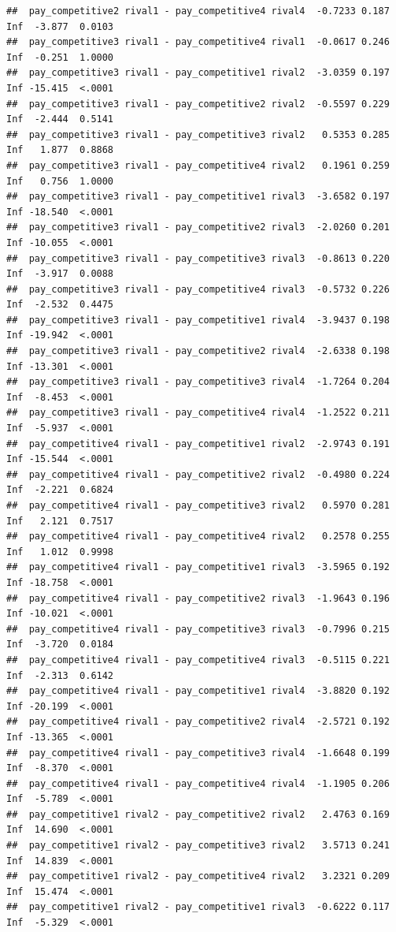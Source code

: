 \documentclass[
]{article}
\begin{document}
\begin{verbatim}
##  pay_competitive2 rival1 - pay_competitive4 rival4  -0.7233 0.187 Inf  -3.877  0.0103
##  pay_competitive3 rival1 - pay_competitive4 rival1  -0.0617 0.246 Inf  -0.251  1.0000
##  pay_competitive3 rival1 - pay_competitive1 rival2  -3.0359 0.197 Inf -15.415  <.0001
##  pay_competitive3 rival1 - pay_competitive2 rival2  -0.5597 0.229 Inf  -2.444  0.5141
##  pay_competitive3 rival1 - pay_competitive3 rival2   0.5353 0.285 Inf   1.877  0.8868
##  pay_competitive3 rival1 - pay_competitive4 rival2   0.1961 0.259 Inf   0.756  1.0000
##  pay_competitive3 rival1 - pay_competitive1 rival3  -3.6582 0.197 Inf -18.540  <.0001
##  pay_competitive3 rival1 - pay_competitive2 rival3  -2.0260 0.201 Inf -10.055  <.0001
##  pay_competitive3 rival1 - pay_competitive3 rival3  -0.8613 0.220 Inf  -3.917  0.0088
##  pay_competitive3 rival1 - pay_competitive4 rival3  -0.5732 0.226 Inf  -2.532  0.4475
##  pay_competitive3 rival1 - pay_competitive1 rival4  -3.9437 0.198 Inf -19.942  <.0001
##  pay_competitive3 rival1 - pay_competitive2 rival4  -2.6338 0.198 Inf -13.301  <.0001
##  pay_competitive3 rival1 - pay_competitive3 rival4  -1.7264 0.204 Inf  -8.453  <.0001
##  pay_competitive3 rival1 - pay_competitive4 rival4  -1.2522 0.211 Inf  -5.937  <.0001
##  pay_competitive4 rival1 - pay_competitive1 rival2  -2.9743 0.191 Inf -15.544  <.0001
##  pay_competitive4 rival1 - pay_competitive2 rival2  -0.4980 0.224 Inf  -2.221  0.6824
##  pay_competitive4 rival1 - pay_competitive3 rival2   0.5970 0.281 Inf   2.121  0.7517
##  pay_competitive4 rival1 - pay_competitive4 rival2   0.2578 0.255 Inf   1.012  0.9998
##  pay_competitive4 rival1 - pay_competitive1 rival3  -3.5965 0.192 Inf -18.758  <.0001
##  pay_competitive4 rival1 - pay_competitive2 rival3  -1.9643 0.196 Inf -10.021  <.0001
##  pay_competitive4 rival1 - pay_competitive3 rival3  -0.7996 0.215 Inf  -3.720  0.0184
##  pay_competitive4 rival1 - pay_competitive4 rival3  -0.5115 0.221 Inf  -2.313  0.6142
##  pay_competitive4 rival1 - pay_competitive1 rival4  -3.8820 0.192 Inf -20.199  <.0001
##  pay_competitive4 rival1 - pay_competitive2 rival4  -2.5721 0.192 Inf -13.365  <.0001
##  pay_competitive4 rival1 - pay_competitive3 rival4  -1.6648 0.199 Inf  -8.370  <.0001
##  pay_competitive4 rival1 - pay_competitive4 rival4  -1.1905 0.206 Inf  -5.789  <.0001
##  pay_competitive1 rival2 - pay_competitive2 rival2   2.4763 0.169 Inf  14.690  <.0001
##  pay_competitive1 rival2 - pay_competitive3 rival2   3.5713 0.241 Inf  14.839  <.0001
##  pay_competitive1 rival2 - pay_competitive4 rival2   3.2321 0.209 Inf  15.474  <.0001
##  pay_competitive1 rival2 - pay_competitive1 rival3  -0.6222 0.117 Inf  -5.329  <.0001

\end{verbatim}
\end{document}
